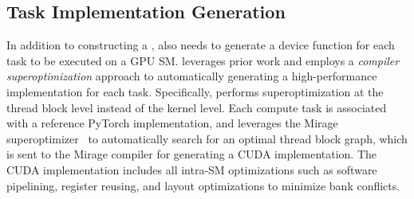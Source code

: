 \subsection{Task Implementation Generation}
In addition to constructing a \graph, \sys also needs to generate a device function for each task to be executed on a GPU SM. \sys leverages prior work and employs a {\em compiler superoptimization} approach to automatically generating a high-performance implementation for each task.
Specifically, \sys performs superoptimization at the thread block level instead of the kernel level. Each compute task is associated with a reference PyTorch implementation, and \sys leverages the Mirage superoptimizer~\cite{wu2025mirage} to automatically search for an optimal thread block graph, which is sent to the Mirage compiler for generating a CUDA implementation. The CUDA implementation includes all intra-SM optimizations such as software pipelining, register reusing, and layout optimizations to minimize bank conflicts.


